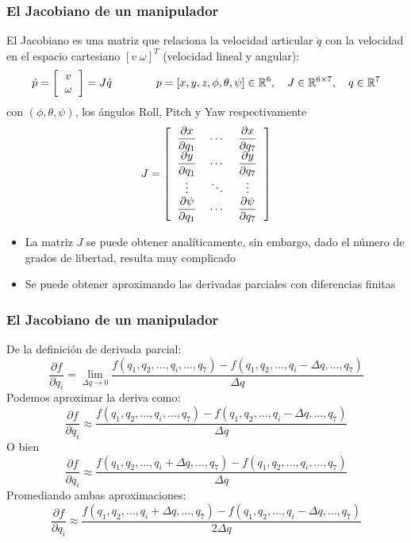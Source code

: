 \begin{frame}\frametitle{El Jacobiano de un manipulador}
  El Jacobiano es una matriz que relaciona la velocidad articular $\dot{q}$ con la velocidad en el espacio cartesiano $[v\;\omega]^T$ (velocidad lineal y angular):
  \[\dot{p} = \left[\begin{tabular}{c}$v$\\$\omega$\end{tabular}\right] = J \dot{q}
  \qquad\qquad p =[x,y,z,\phi,\theta,\psi] \in \mathbb{R}^6, \quad J\in \mathbb{R}^{6\times 7},\quad q\in \mathbb{R}^7\]
  con $(\phi,\theta,\psi)$, los ángulos Roll, Pitch y Yaw respectivamente
  \[J = \left[ \begin{tabular}{ccc}
    $\dfrac{\partial x}{\partial q_1}$ & $\cdots$ & $\dfrac{\partial x}{\partial q_7}$\\
    $\dfrac{\partial y}{\partial q_1}$ & $\cdots$ & $\dfrac{\partial y}{\partial q_7}$\\
      $\vdots$ & $\ddots$ & $\vdots$ \\
      $\dfrac{\partial \psi}{\partial q_1}$ & $\cdots$ & $\dfrac{\partial \psi}{\partial q_7}$\\
    \end{tabular} \right]\]
\begin{itemize}
\item La matriz $J$ se puede obtener analíticamente, sin embargo, dado el número de grados de libertad, resulta muy complicado
\item Se puede obtener aproximando las derivadas parciales con diferencias finitas
\end{itemize}
\end{frame}

\begin{frame}\frametitle{El Jacobiano de un manipulador}
  De la definición de derivada parcial:
  \[\frac{\partial f}{\partial q_i} = \lim_{\Delta q \rightarrow 0}\frac{f(q_1, q_2, \dots, q_i, \dots, q_7) -
      f(q_1, q_2,\dots,q_i-\Delta q, \dots, q_7)}{\Delta q}\]
  Podemos aproximar la deriva como:
  \[\frac{\partial f}{\partial q_i} \approx \frac{f(q_1, q_2, \dots, q_i, \dots, q_7) -
      f(q_1, q_2,\dots,q_i-\Delta q, \dots, q_7)}{\Delta q}\]
  O bien
  \[\frac{\partial f}{\partial q_i} \approx \frac{f(q_1, q_2, \dots, q_i+\Delta q, \dots, q_7) -
      f(q_1, q_2,\dots,q_i, \dots, q_7)}{\Delta q}\]
  Promediando ambas aproximaciones:
  \[\frac{\partial f}{\partial q_i} \approx \frac{f(q_1, q_2, \dots, q_i+\Delta q, \dots, q_7) -
      f(q_1, q_2,\dots,q_i-\Delta q, \dots, q_7)}{2\Delta q}\]
\end{frame}


